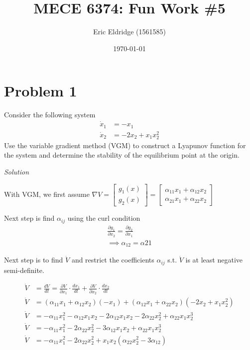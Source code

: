 \documentclass{article}
\title{MECE 6374: Fun Work \#5}
\date{\today}
\author{Eric Eldridge (1561585)}
\begin{document}

  \maketitle

  \section{Problem 1}

  Consider the following system
  \begin{align*}
    \dot{x}_1 &= -x_1 \\
    \dot{x}_2 &= -2x_2 +x_1x_2^2
  \end{align*}
  Use the variable gradient method (VGM) to construct a Lyapunov function for the
  system and determine the stability of the equilibrium point at the origin.
  \newline \newline

  \noindent \textit{Solution} \newline \newline

  With VGM, we first assume $\nabla V =
  \begin{bmatrix}
    g_1(x) \\
    g_2(x)
  \end{bmatrix} =
  \begin{bmatrix}
    \alpha_{11}x_1 + \alpha_{12}x_2 \\
    \alpha_{21}x_1 + \alpha_{22}x_2
  \end{bmatrix}$ \newline
  
  Next step is find $\alpha_{ij}$ using the curl condition \newline
  \begin{align*}
    \frac{\partial g_1}{\partial x_2} = \frac{\partial g_2}{\partial x_1} \\
    \implies \alpha_{12} = \alpha{21}
  \end{align*}

  Next step is to find $\dot{V}$ and restrict the coefficients $\alpha_{ij}$
  s.t. $\dot{V}$ is at least negative semi-definite.

  \begin{align*}
    \dot{V} &= \frac{dV}{dt} = \frac{\partial V}{\partial x_1} \cdot \frac{dx_1}{dt} + \frac{\partial V}{\partial x_2} \cdot \frac{dx_2}{dt} \\
    \dot{V} &= (\alpha_{11}x_1 + \alpha_{12}x_2)(-x_1) + (\alpha_{12}x_1 + \alpha_{22}x_2)(-2x_2 + x_1x_2^2) \\
    \dot{V} &= -\alpha_{11}x_1^2 - \alpha_{12}x_1x_2 - 2\alpha_{12}x_1x_2 -2\alpha_{22}x_2^2 + \alpha_{22}x_1x_2^3 \\
    \dot{V} &= -\alpha_{11}x_1^2 - 2\alpha_{22}x_2^2 - 3\alpha_{12}x_1x_2 + \alpha_{22}x_1x_2^3 \\
    \dot{V} &= -\alpha_{11}x_1^2 - 2\alpha_{22}x_2^2 + x_1x_2(\alpha_{22}x_2^2 -3\alpha_{12})
  \end{align*}
\end{document}
